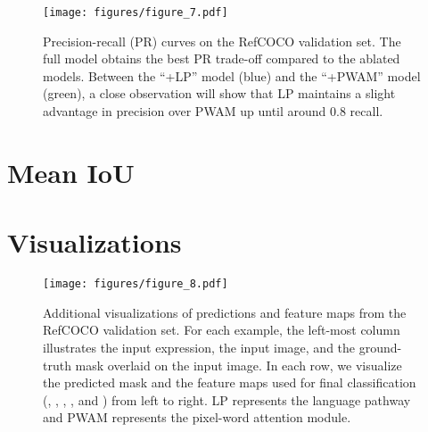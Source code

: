 \documentclass[10pt,twocolumn,letterpaper]{article}
\begin{document}
\begin{figure}[t]
\centering
\texttt{[image: figures/figure\_7.pdf]}
\caption{Precision-recall (PR) curves on the RefCOCO validation set. The full model obtains the best PR trade-off compared to the ablated models.
Between the ``+LP'' model (blue) and the ``+PWAM'' model (green), a close observation will show that LP maintains a slight advantage in precision over PWAM up until around 0.8 recall.}
\label{fig:7}
\end{figure}


\newpage
\onecolumn
\section{Mean IoU} \label{sec:mIoU}
\begin{table*}[ht]
   \centering
   \caption{Mean IoU of LAVT on the three benchmark datasets. These results complement the overall IoU reported in Table 1 of the main paper. Since mean IoU treats each object equally and does not favor large objects (as overall IoU does), we consider it a fairer metric and recommend more of its use for evaluating this task in the future.}
   \label{tab:6}
\end{table*}


\section{Visualizations} \label{sec:vis}
\begin{figure*}[ht]
\centering
\texttt{[image: figures/figure\_8.pdf]}
\caption{Additional visualizations of predictions and feature maps from the RefCOCO validation set. For each example, the left-most column illustrates the input expression, the input image, and the ground-truth mask overlaid on the input image. In each row, we visualize the predicted mask and the feature maps used for final classification (\ie, , , , and ) from left to right. LP represents the language pathway and PWAM represents the pixel-word attention module.}
\label{fig:8}
\end{figure*}
\end{document}

